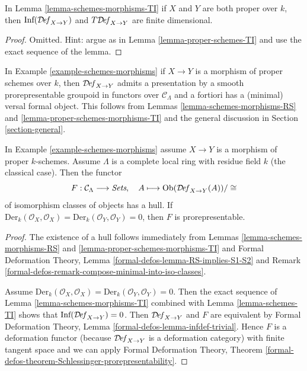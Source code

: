 \begin{lemma}
\label{lemma-proper-schemes-morphisms-TI}
In Lemma \ref{lemma-schemes-morphisms-TI} if $X$ and $Y$ are both
proper over $k$, then
$\text{Inf}(\mathcal{D}\!\mathit{ef}_{X \to Y})$ and
$T\mathcal{D}\!\mathit{ef}_{X \to Y}$ are finite dimensional.
\end{lemma}

\begin{proof}
Omitted. Hint: argue as in Lemma \ref{lemma-proper-schemes-TI}
and use the exact sequence of the lemma.
\end{proof}

\noindent
In Example \ref{example-schemes-morphisms}
if $X \to Y$ is a morphism of proper schemes over $k$,
then $\mathcal{D}\!\mathit{ef}_{X \to Y}$
admits a presentation by a smooth prorepresentable groupoid in functors
over $\mathcal{C}_\Lambda$
and a fortiori has a (minimal) versal formal object. This follows
from Lemmas \ref{lemma-schemes-morphisms-RS} and
\ref{lemma-proper-schemes-morphisms-TI}
and the general discussion in Section \ref{section-general}.

\begin{lemma}
\label{lemma-schemes-morphisms-hull}
In Example \ref{example-schemes-morphisms} assume $X \to Y$
is a morphism of proper $k$-schemes.
Assume $\Lambda$ is a complete local ring with residue field $k$
(the classical case). Then the functor
$$
F : \mathcal{C}_\Lambda \longrightarrow \textit{Sets},\quad
A \longmapsto \mathop{\mathrm{Ob}}\nolimits(\mathcal{D}\!\mathit{ef}_{X \to Y}(A))/\cong
$$
of isomorphism classes of objects has a hull. If
$\text{Der}_k(\mathcal{O}_X, \mathcal{O}_X) =
\text{Der}_k(\mathcal{O}_Y, \mathcal{O}_Y) = 0$, then
$F$ is prorepresentable.
\end{lemma}

\begin{proof}
The existence of a hull follows immediately from
Lemmas \ref{lemma-schemes-morphisms-RS} and
\ref{lemma-proper-schemes-morphisms-TI} and
Formal Deformation Theory, Lemma \ref{formal-defos-lemma-RS-implies-S1-S2}
and Remark \ref{formal-defos-remark-compose-minimal-into-iso-classes}.

\medskip\noindent
Assume $\text{Der}_k(\mathcal{O}_X, \mathcal{O}_X) =
\text{Der}_k(\mathcal{O}_Y, \mathcal{O}_Y) = 0$. Then
the exact sequence of Lemma \ref{lemma-schemes-morphisms-TI}
combined with Lemma \ref{lemma-schemes-TI}
shows that $\text{Inf}(\mathcal{D}\!\mathit{ef}_{X \to Y}) = 0$.
Then $\mathcal{D}\!\mathit{ef}_{X \to Y}$ and $F$ are equivalent by
Formal Deformation Theory, Lemma \ref{formal-defos-lemma-infdef-trivial}.
Hence $F$ is a deformation functor (because
$\mathcal{D}\!\mathit{ef}_{X \to Y}$ is a
deformation category) with finite tangent space and we can apply
Formal Deformation Theory, Theorem
\ref{formal-defos-theorem-Schlessinger-prorepresentability}.
\end{proof}

